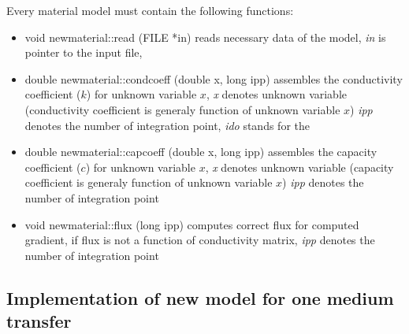 Every material model must contain the following functions:
\begin{itemize}
\item{
{\sf void newmaterial::read (FILE *in)}
\newline reads necessary data of the model, {\it in} is pointer to the input file,
}
\item{
{\sf double newmaterial::condcoeff (double x, long ipp)}
\newline assembles the conductivity coefficient ($k$) for unknown variable $x$, 
{\it x} denotes unknown variable (conductivity coefficient is generaly function of unknown variable $x$)
{\it ipp} denotes the number of integration point, {\it ido} stands for the
}

\item{
{\sf double newmaterial::capcoeff (double x, long ipp)}
\newline assembles the capacity coefficient ($c$) for unknown variable $x$,
{\it x} denotes unknown variable (capacity coefficient is generaly function of unknown variable $x$)
{\it ipp} denotes the number of integration point
}

\item{
{\sf void newmaterial::flux (long ipp)}
\newline computes correct flux for computed gradient, if flux is not a function of conductivity matrix,
{\it ipp} denotes the number of integration point
}

\end{itemize}

\subsection{Implementation of new model for one medium transfer}

